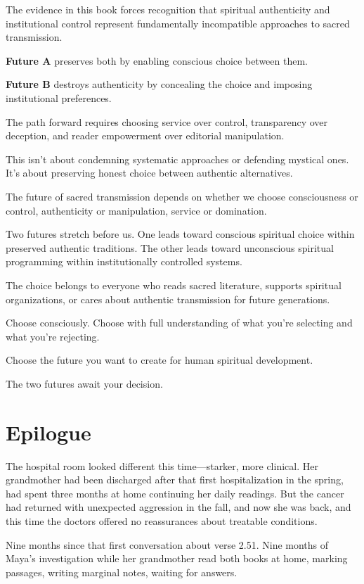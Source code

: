 \documentclass[12pt,twoside]{book}
\begin{document}
The evidence in this book forces recognition that spiritual authenticity and institutional control represent fundamentally incompatible approaches to sacred transmission.

\textbf{\textbf{Future A}} preserves both by enabling conscious choice between them.

\textbf{\textbf{Future B}} destroys authenticity by concealing the choice and imposing institutional preferences.

The path forward requires choosing service over control, transparency over deception, and reader empowerment over editorial manipulation.

This isn't about condemning systematic approaches or defending mystical ones. It's about preserving honest choice between authentic alternatives.

The future of sacred transmission depends on whether we choose consciousness or control, authenticity or manipulation, service or domination.

Two futures stretch before us. One leads toward conscious spiritual choice within preserved authentic traditions. The other leads toward unconscious spiritual programming within institutionally controlled systems.

The choice belongs to everyone who reads sacred literature, supports spiritual organizations, or cares about authentic transmission for future generations.

Choose consciously. Choose with full understanding of what you're selecting and what you're rejecting.

Choose the future you want to create for human spiritual development.

The two futures await your decision.
\part{Epilogue}
\label{sec:org93594cb}
\thispagestyle{chapterpage}

\normalfont\justifying

The hospital room looked different this time—starker, more clinical. Her grandmother had been discharged after that first hospitalization in the spring, had spent three months at home continuing her daily readings. But the cancer had returned with unexpected aggression in the fall, and now she was back, and this time the doctors offered no reassurances about treatable conditions.

Nine months since that first conversation about verse 2.51. Nine months of Maya's investigation while her grandmother read both books at home, marking passages, writing marginal notes, waiting for answers.
\end{document}
